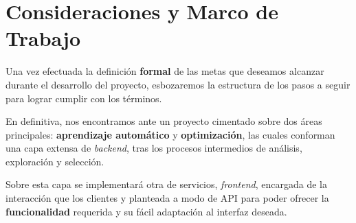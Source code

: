 \section{Consideraciones y Marco de Trabajo}

Una vez efectuada la definición \textbf{formal} de las metas que deseamos alcanzar durante el desarrollo del proyecto, esbozaremos la estructura de los pasos a seguir para lograr cumplir con los términos.

En definitiva, nos encontramos ante un proyecto cimentado sobre dos áreas principales: \textbf{aprendizaje automático} y \textbf{optimización}, las cuales conforman una capa extensa de \textit{backend}, tras los procesos intermedios de análisis, exploración y selección.

Sobre esta capa se implementará otra de servicios, \textit{frontend}, encargada de la interacción que los clientes y planteada a modo de API para poder ofrecer la \textbf{funcionalidad} requerida y su fácil adaptación al interfaz deseada.


